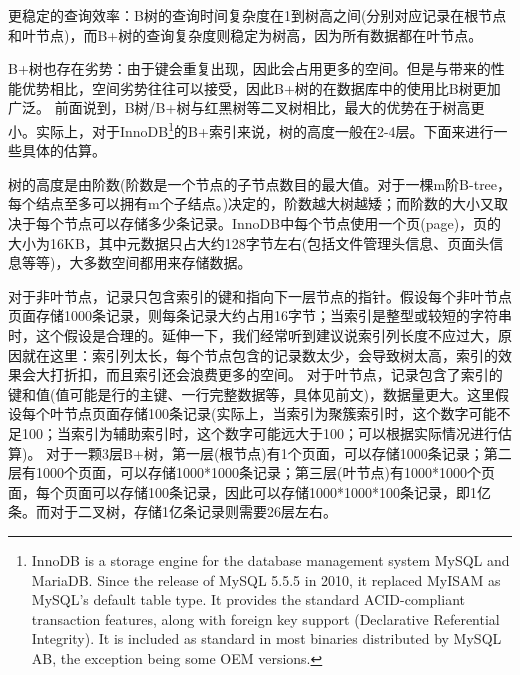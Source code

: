 \documentclass[../../../interview-questions.tex]{subfiles}
\begin{document}
更稳定的查询效率：B树的查询时间复杂度在1到树高之间(分别对应记录在根节点和叶节点)，而B+树的查询复杂度则稳定为树高，因为所有数据都在叶节点。

B+树也存在劣势：由于键会重复出现，因此会占用更多的空间。但是与带来的性能优势相比，空间劣势往往可以接受，因此B+树的在数据库中的使用比B树更加广泛。
前面说到，B树/B+树与红黑树等二叉树相比，最大的优势在于树高更小。实际上，对于InnoDB\footnote{InnoDB is a storage engine for the database management system MySQL and MariaDB. Since the release of MySQL 5.5.5 in 2010, it replaced MyISAM as MySQL's default table type. It provides the standard ACID-compliant transaction features, along with foreign key support (Declarative Referential Integrity). It is included as standard in most binaries distributed by MySQL AB, the exception being some OEM versions.}的B+索引来说，树的高度一般在2-4层。下面来进行一些具体的估算。

树的高度是由阶数(阶数是一个节点的子节点数目的最大值。对于一棵m阶B-tree，每个结点至多可以拥有m个子结点。)决定的，阶数越大树越矮；而阶数的大小又取决于每个节点可以存储多少条记录。InnoDB中每个节点使用一个页(page)，页的大小为16KB，其中元数据只占大约128字节左右(包括文件管理头信息、页面头信息等等)，大多数空间都用来存储数据。

对于非叶节点，记录只包含索引的键和指向下一层节点的指针。假设每个非叶节点页面存储1000条记录，则每条记录大约占用16字节；当索引是整型或较短的字符串时，这个假设是合理的。延伸一下，我们经常听到建议说索引列长度不应过大，原因就在这里：索引列太长，每个节点包含的记录数太少，会导致树太高，索引的效果会大打折扣，而且索引还会浪费更多的空间。
对于叶节点，记录包含了索引的键和值(值可能是行的主键、一行完整数据等，具体见前文)，数据量更大。这里假设每个叶节点页面存储100条记录(实际上，当索引为聚簇索引时，这个数字可能不足100；当索引为辅助索引时，这个数字可能远大于100；可以根据实际情况进行估算)。
对于一颗3层B+树，第一层(根节点)有1个页面，可以存储1000条记录；第二层有1000个页面，可以存储1000*1000条记录；第三层(叶节点)有1000*1000个页面，每个页面可以存储100条记录，因此可以存储1000*1000*100条记录，即1亿条。而对于二叉树，存储1亿条记录则需要26层左右。
\end{document}

